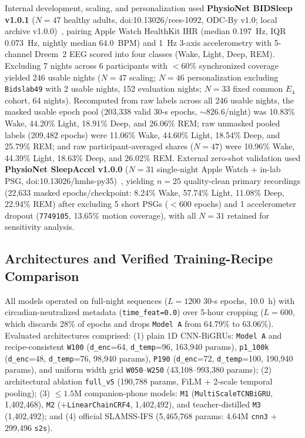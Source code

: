 \documentclass[journal]{IEEEtran}
\begin{document}
Internal development, scaling, and personalization used \textbf{PhysioNet BIDSleep v1.0.1} ($N=47$ healthy adults, doi:10.13026/rees-1092, ODC-By v1.0; local archive v1.0.0)~\cite{song2026bidsleep,bidsleep_data}, pairing Apple Watch HealthKit IHR (median 0.197~Hz, IQR 0.073~Hz, nightly median 64.0~BPM) and 1~Hz 3-axis accelerometry with 5-channel Dreem~2 EEG scored into four classes (Wake, Light, Deep, REM). Excluding 7 nights across 6 participants with $<60\%$ synchronized coverage yielded 246 usable nights ($N=47$ scaling; $N=46$ personalization excluding \texttt{Bidslab49} with 2 usable nights, 152 evaluation nights; $N=33$ fixed common $E_4$ cohort, 64 nights). Recomputed from raw labels across all 246 usable nights, the masked usable epoch pool (203,338 valid 30-s epochs, $\sim$826.6/night) was 10.83\% Wake, 44.20\% Light, 18.91\% Deep, and 26.06\% REM; raw unmasked pooled labels (209,482 epochs) were 11.06\% Wake, 44.60\% Light, 18.54\% Deep, and 25.79\% REM; and raw participant-averaged shares ($N=47$) were 10.96\% Wake, 44.39\% Light, 18.63\% Deep, and 26.02\% REM. External zero-shot validation used \textbf{PhysioNet SleepAccel v1.0.0} ($N=31$ single-night Apple Watch + in-lab PSG, doi:10.13026/hmhs-py35)~\cite{walch2019sleepaccel,walch2019sleepaccel_data}, yielding $n=25$ quality-clean primary recordings (22,633 masked epochs/checkpoint: 8.24\% Wake, 57.74\% Light, 11.08\% Deep, 22.94\% REM) after excluding 5 short PSGs ($<600$ epochs) and 1 accelerometer dropout (\texttt{7749105}, 13.65\% motion coverage), with all $N=31$ retained for sensitivity analysis.

\subsection{Architectures and Verified Training-Recipe Comparison}
All models operated on full-night sequences ($L=1200$ 30-s epochs, 10.0~h) with circadian-neutralized metadata (\texttt{time\_feat=0.0}) over 5-hour cropping ($L=600$, which discards 28\% of epochs and drops \texttt{Model~A} from 64.79\% to 63.06\%). Evaluated architectures comprised: (1) plain 1D CNN-BiGRUs: \texttt{Model~A} and recipe-consistent \texttt{W100} (\texttt{d\_enc}=64, \texttt{d\_temp}=96, 163,940 params), \texttt{p1\_100k} (\texttt{d\_enc}=48, \texttt{d\_temp}=76, 98,940 params), \texttt{P190} (\texttt{d\_enc}=72, \texttt{d\_temp}=100, 190,940 params), and uniform width grid \texttt{W050}--\texttt{W250} (43,108--993,380 params); (2) architectural ablation \texttt{full\_v5} (190,788 params, FiLM + 2-scale temporal pooling); (3) $\le 1.5$M companion-phone models: \texttt{M1} (\texttt{MultiScaleTCNBiGRU}, 1,402,468), \texttt{M2} (+\texttt{LinearChainCRF4}, 1,402,492), and teacher-distilled \texttt{M3} (1,402,492); and (4) official SLAMSS-IFS (5,465,768 params: 4.64M \texttt{cnn3} + 299,496 \texttt{s2s}).
\end{document}
